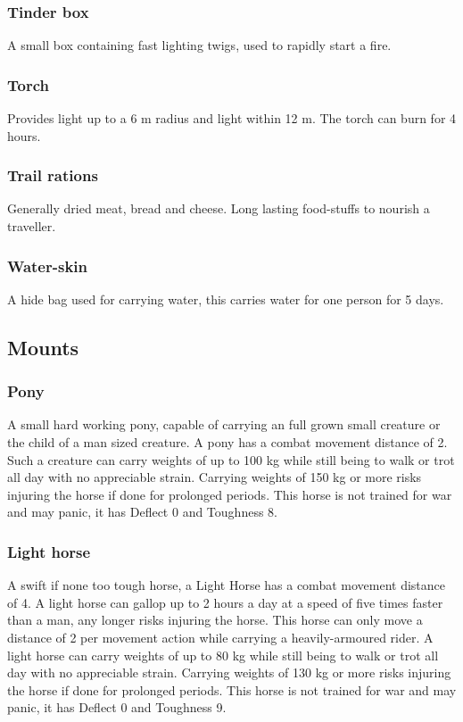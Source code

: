 \documentclass[a4paper,11pt,oneside]{book}
\newcommand{\textlf}[1]{\textbf{\titlecap{#1}}}
\begin{document}
\subsubsection*{Tinder box}
A small box containing fast lighting twigs, used to rapidly start a fire.

\subsubsection*{Torch}
Provides \textlf{full} light up to a 6 m radius and \textlf{low} light within 12 m. The torch can burn for 4 hours.

\subsubsection*{Trail rations}
Generally dried meat, bread and cheese. Long lasting food-stuffs to nourish a traveller.

\subsubsection*{Water-skin}
A hide bag used for carrying water, this carries water for one person for 5 days.

\subsection{Mounts}
\subsubsection*{Pony}
A small hard working pony, capable of carrying an full grown small creature or the child of a man sized creature. A pony has a combat movement distance of 2. Such a creature can carry weights of up to 100 kg while still being to walk or trot all day with no appreciable strain. Carrying weights of 150 kg or more risks injuring the horse if done for prolonged periods. This horse is not trained for war and may panic, it has Deflect 0 and Toughness 8.

\subsubsection*{Light horse}
A swift if none too tough horse, a Light Horse has a combat movement distance of 4. A light horse can gallop up to 2 hours a day at a speed of five times faster than a man, any longer risks injuring the horse. This horse can only move a distance of 2 per movement action while carrying a heavily-armoured rider. A light horse can carry weights of up to 80 kg while still being to walk or trot all day with no appreciable strain. Carrying weights of 130 kg or more risks injuring the horse if done for prolonged periods. This horse is not trained for war and may panic, it has Deflect 0 and Toughness 9.
\end{document}
